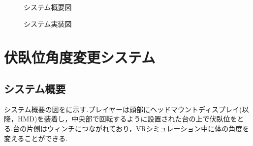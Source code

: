 \documentclass[uplatex]{jsarticle}
\begin{document}
 \begin{figure}[tb]
  \centering
  \caption{システム概要図}
  \label{fig:about_system}

  \centering
  \caption{システム実装図}
  \label{fig:build_system}

\end{figure}

\section{伏臥位角度変更システム}
\subsection{システム概要}
システム概要の図をに示す.プレイヤーは頭部にヘッドマウントディスプレイ(以降，HMD)を装着し，中央部で回転するように設置された台の上で伏臥位をとる.台の片側はウィンチにつながれており，VRシミュレーション中に体の角度を変えることができる.
\end{document}

